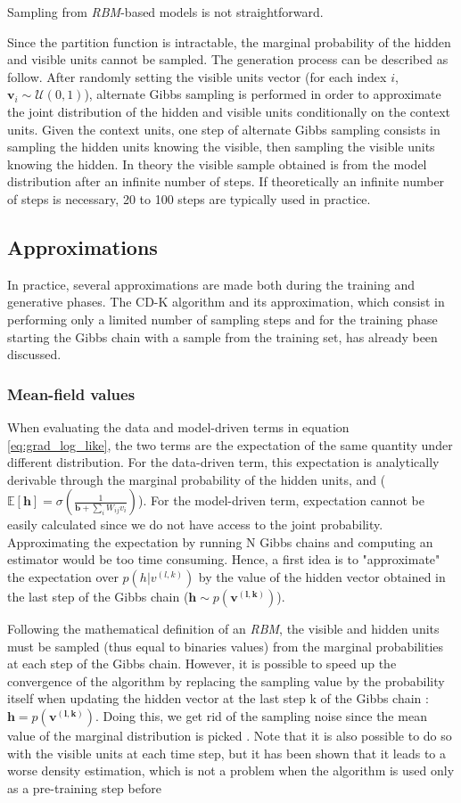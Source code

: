 \documentclass[letterpaper]{article}
\begin{document}
Sampling from \textit{RBM}-based models is not straightforward. 

Since the partition function is intractable, the marginal probability of the hidden and visible units cannot be sampled.
The generation process can be described as follow. After randomly setting the visible units vector (for each index $i$, $\bm{v}_{i} \sim \mathcal{U}(0,1)$), alternate Gibbs sampling is performed in order to approximate the joint distribution of the hidden and visible units conditionally on the context units. Given the context units, one step of alternate Gibbs sampling consists in sampling the hidden units knowing the visible, then sampling the visible units knowing the hidden. In theory the visible sample obtained is from the model distribution after an infinite number of steps. If theoretically an infinite number of steps is necessary, 20 to 100 steps are typically used in practice.

\subsection{Approximations}
In practice, several approximations are made both during the training and generative phases. The CD-K algorithm and its approximation, which consist in performing only a limited number of sampling steps and for the training phase starting the Gibbs chain with a sample from the training set, has already been discussed.

\subsubsection{Mean-field values} When evaluating the data and model-driven terms in equation \ref{eq:grad_log_like}, the two terms are the expectation of the same quantity under different distribution. For the data-driven term, this expectation is analytically derivable through the marginal probability of the hidden units, and ($\mathbb{E}\left[\bm{h}\right] = \sigma(\frac{1}{\bm{b} + \sum_{i} W_{ij}v_{i}})$).
For the model-driven term, expectation cannot be easily calculated since we do not have access to the joint probability. Approximating the expectation by running N Gibbs chains and computing an estimator would be too time consuming. Hence, a first idea is to "approximate" the expectation over $p(h|v^{(l,k)})$  by the value of the hidden vector obtained in the last step of the Gibbs chain ($\bm{h} \sim p(\bm{v^{(l,k)}})$).

Following the mathematical definition of an \textit{RBM}, the visible and hidden units must be sampled (thus equal to binaries values) from the marginal probabilities at each step of the Gibbs chain. However, it is possible to speed up the convergence of the algorithm by replacing the sampling value by the probability itself when updating the hidden vector at the last step k of the Gibbs chain : $\bm{h} = p(\bm{v^{(l,k)}})$. Doing this, we get rid of the sampling noise since the mean value of the marginal distribution is picked \cite{hinton2010practical}. Note that it is also possible to do so with the visible units at each time step, but it has been shown that it leads to a worse density estimation, which  is not a problem when the algorithm is used only as a pre-training step before 
\end{document}
